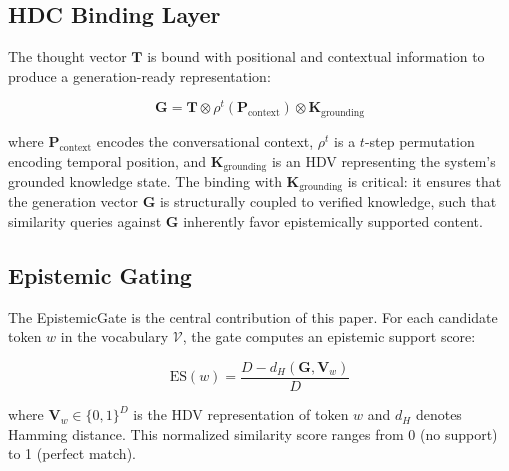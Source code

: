 \documentclass[12pt,a4paper]{article}
\begin{document}
\subsection{HDC Binding Layer}

The thought vector $\mathbf{T}$ is bound with positional and contextual information to produce a generation-ready representation:

\begin{equation}
\mathbf{G} = \mathbf{T} \otimes \rho^t(\mathbf{P}_{\text{context}}) \otimes \mathbf{K}_{\text{grounding}}
\end{equation}

where $\mathbf{P}_{\text{context}}$ encodes the conversational context, $\rho^t$ is a $t$-step permutation encoding temporal position, and $\mathbf{K}_{\text{grounding}}$ is an HDV representing the system's grounded knowledge state. The binding with $\mathbf{K}_{\text{grounding}}$ is critical: it ensures that the generation vector $\mathbf{G}$ is structurally coupled to verified knowledge, such that similarity queries against $\mathbf{G}$ inherently favor epistemically supported content.

\subsection{Epistemic Gating}

The EpistemicGate is the central contribution of this paper. For each candidate token $w$ in the vocabulary $\mathcal{V}$, the gate computes an epistemic support score:

\begin{equation}
\text{ES}(w) = \frac{D - d_H(\mathbf{G}, \mathbf{V}_w)}{D}
\label{eq:epistemic-support}
\end{equation}

where $\mathbf{V}_w \in \{0,1\}^D$ is the HDV representation of token $w$ and $d_H$ denotes Hamming distance. This normalized similarity score ranges from 0 (no support) to 1 (perfect match).
\end{document}
